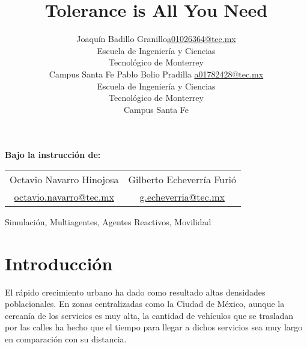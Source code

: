 \documentclass[twoside,11pt]{article}
\newcommand{\myname}{Joaquín Badillo Granillo}
\begin{document}
\renewcommand{\tablename}{Tabla}

\title{Tolerance is All You Need}

\author{\name \myname \email \href{mailto:a01026364@tec.mx}{a01026364@tec.mx} \\
       \addr Escuela de Ingeniería y Ciencias\\
       Tecnológico de Monterrey\\
       Campus Santa Fe
       \AND
       \name Pablo Bolio Pradilla \email \href{mailto:a01782428@tec.mx}{a01782428@tec.mx} \\
       \addr Escuela de Ingeniería y Ciencias\\
       Tecnológico de Monterrey\\
       Campus Santa Fe
       }

\maketitle

\vspace{-16pt}

\begin{center}
  \textbf{Bajo la instrucción de:}
  
  \vspace{8pt}

  \begin{tabular}{cc}
    \hspace{34pt}Octavio Navarro Hinojosa\hspace{34pt} & \hspace{34pt}Gilberto Echeverría Furió\hspace{34pt} \\
    \href{mailto:octavio.navarro@tec.mx}{octavio.navarro@tec.mx} & \href{mailto:g.echeverria@tec.mx}{g.echeverria@tec.mx} 
  \end{tabular}
\end{center}

  \vspace{14pt}

\begin{abstract}
    
\end{abstract}

\begin{keywords}
  Simulación, Multiagentes, Agentes Reactivos, Movilidad
\end{keywords}

\section{Introducción}
El rápido crecimiento urbano ha dado como resultado altas densidades poblacionales.
En zonas centralizadas como la Ciudad de México, aunque la cercanía de los servicios
es muy alta, la cantidad de vehículos que se trasladan por las calles ha hecho que
el tiempo para llegar a dichos servicios sea muy largo en comparación con su distancia.
\end{document}
